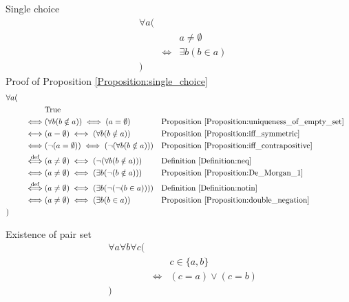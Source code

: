 \begin{prop}
\label{Proposition:single_choice}
Single choice
\begin{align*}
& \forall a ( \\
& & & a \neq \emptyset \\
& & \iff & \exists b (b \in a) \\
& )
\end{align*}
Proof of Proposition \ref{Proposition:single_choice}
\begin{align*}
& \forall a ( \\
& & & \text{True} \\
& & \iff & (\forall b (b \notin a)) \iff (a = \emptyset)
& & \text{Proposition \ref{Proposition:uniqueness_of_empty_set}} \\
& & \iff & (a = \emptyset) \iff (\forall b (b \notin a))
& & \text{Proposition \ref{Proposition:iff_symmetric}} \\
& & \iff & (\lnot (a = \emptyset)) \iff (\lnot (\forall b (b \notin a)))
& & \text{Proposition \ref{Proposition:iff_contrapositive}} \\
& & \overset{\operatorname{def}}{\iff} & (a \neq \emptyset) \iff (\lnot (\forall b (b \notin a)))
& & \text{Definition \ref{Definition:neq}} \\
& & \iff & (a \neq \emptyset) \iff (\exists b (\lnot (b \notin a)))
& & \text{Proposition \ref{Proposition:De_Morgan_1}} \\
& & \overset{\operatorname{def}}{\iff} & (a \neq \emptyset) \iff (\exists b (\lnot (\lnot (b \in a))))
& & \text{Definition \ref{Definition:notin}} \\
& & \iff & (a \neq \emptyset) \iff (\exists b (b \in a))
& & \text{Proposition \ref{Proposition:double_negation}} \\
& )
\end{align*}
\end{prop}

\begin{axm}
\label{Axiom:existence_of_pair_set}
Existence of pair set
\begin{align*}
& \forall a \forall b \forall c ( \\
& & & c \in \{ a , b \} \\
& & \iff & (c = a) \lor (c = b) \\
& )
\end{align*}
\end{axm}

